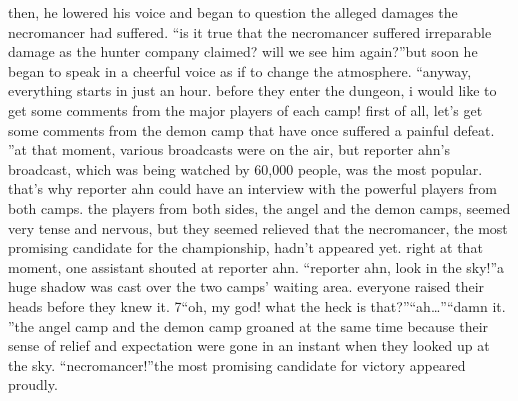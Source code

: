 then, he lowered his voice and began to question the alleged damages the necromancer had suffered.
“is it true that the necromancer suffered irreparable damage as the hunter company claimed? will we see him again?”but soon he began to speak in a cheerful voice as if to change the atmosphere.
“anyway, everything starts in just an hour.
 before they enter the dungeon, i would like to get some comments from the major players of each camp! first of all, let’s get some comments from the demon camp that have once suffered a painful defeat.
”at that moment, various broadcasts were on the air, but reporter ahn’s broadcast, which was being watched by 60,000 people, was the most popular.
 that’s why reporter ahn could have an interview with the powerful players from both camps.
the players from both sides, the angel and the demon camps, seemed very tense and nervous, but they seemed relieved that the necromancer, the most promising candidate for the championship, hadn’t appeared yet.
right at that moment, one assistant shouted at reporter ahn.
“reporter ahn, look in the sky!”a huge shadow was cast over the two camps’ waiting area.
 everyone raised their heads before they knew it.
 7“oh, my god! what the heck is that?”“ah…”“damn it.
”the angel camp and the demon camp groaned at the same time because their sense of relief and expectation were gone in an instant when they looked up at the sky.
“necromancer!”the most promising candidate for victory appeared proudly.


 